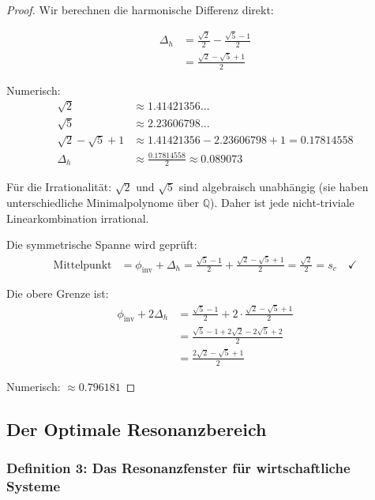 \documentclass[a4paper, 12pt, twoside, openright]{report}
\theoremstyle{definition}
\theoremstyle{definition}
\begin{document}
\begin{proof}

Wir berechnen die harmonische Differenz direkt:

\begin{align}
\Delta_h &= \frac{\sqrt{2}}{2} - \frac{\sqrt{5}-1}{2} \\
&= \frac{\sqrt{2} - \sqrt{5} + 1}{2}
\end{align}

Numerisch:
\begin{align}
\sqrt{2} &\approx 1.41421356... \\
\sqrt{5} &\approx 2.23606798... \\
\sqrt{2} - \sqrt{5} + 1 &\approx 1.41421356 - 2.23606798 + 1 = 0.17814558 \\
\Delta_h &\approx \frac{0.17814558}{2} \approx 0.089073
\end{align}

Für die Irrationalität: $\sqrt{2}$ und $\sqrt{5}$ sind algebraisch unabhängig (sie haben unterschiedliche Minimalpolynome über $\mathbb{Q}$). Daher ist jede nicht-triviale Linearkombination irrational.

Die symmetrische Spanne wird geprüft:
\begin{align}
\text{Mittelpunkt} &= \phi_{\text{inv}} + \Delta_h = \frac{\sqrt{5}-1}{2} + \frac{\sqrt{2}-\sqrt{5}+1}{2} = \frac{\sqrt{2}}{2} = s_c \quad \checkmark
\end{align}

Die obere Grenze ist:
\begin{align}
\phi_{\text{inv}} + 2\Delta_h &= \frac{\sqrt{5}-1}{2} + 2 \cdot \frac{\sqrt{2}-\sqrt{5}+1}{2} \\
&= \frac{\sqrt{5}-1 + 2\sqrt{2} - 2\sqrt{5} + 2}{2} \\
&= \frac{2\sqrt{2} - \sqrt{5} + 1}{2}
\end{align}

Numerisch: $\approx 0.796181$

\end{proof}

\subsection{Der Optimale Resonanzbereich}

\subsubsection{Definition 3: Das Resonanzfenster für wirtschaftliche Systeme}
\end{document}
